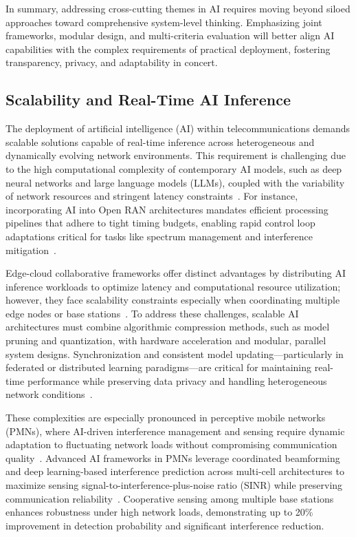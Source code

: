 \documentclass[sigconf]{acmart}
\begin{document}
In summary, addressing cross-cutting themes in AI requires moving beyond siloed approaches toward comprehensive system-level thinking. Emphasizing joint frameworks, modular design, and multi-criteria evaluation will better align AI capabilities with the complex requirements of practical deployment, fostering transparency, privacy, and adaptability in concert.

\subsection{Scalability and Real-Time AI Inference}

The deployment of artificial intelligence (AI) within telecommunications demands scalable solutions capable of real-time inference across heterogeneous and dynamically evolving network environments. This requirement is challenging due to the high computational complexity of contemporary AI models, such as deep neural networks and large language models (LLMs), coupled with the variability of network resources and stringent latency constraints~\cite{ref7,ref49,ref52,ref53}. For instance, incorporating AI into Open RAN architectures mandates efficient processing pipelines that adhere to tight timing budgets, enabling rapid control loop adaptations critical for tasks like spectrum management and interference mitigation~\cite{ref48}.

Edge-cloud collaborative frameworks offer distinct advantages by distributing AI inference workloads to optimize latency and computational resource utilization; however, they face scalability constraints especially when coordinating multiple edge nodes or base stations~\cite{ref49}. To address these challenges, scalable AI architectures must combine algorithmic compression methods, such as model pruning and quantization, with hardware acceleration and modular, parallel system designs. Synchronization and consistent model updating—particularly in federated or distributed learning paradigms—are critical for maintaining real-time performance while preserving data privacy and handling heterogeneous network conditions~\cite{ref52}.

These complexities are especially pronounced in perceptive mobile networks (PMNs), where AI-driven interference management and sensing require dynamic adaptation to fluctuating network loads without compromising communication quality~\cite{ref53}. Advanced AI frameworks in PMNs leverage coordinated beamforming and deep learning-based interference prediction across multi-cell architectures to maximize sensing signal-to-interference-plus-noise ratio (SINR) while preserving communication reliability~\cite{ref48}. Cooperative sensing among multiple base stations enhances robustness under high network loads, demonstrating up to 20\% improvement in detection probability and significant interference reduction.
\end{document}

